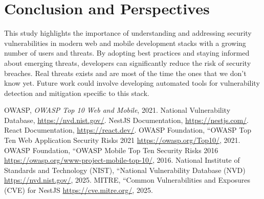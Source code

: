 \documentclass[conference]{IEEEtran}
\begin{document}
\section{Conclusion and Perspectives}
This study highlights the importance of understanding and addressing security vulnerabilities in modern web and mobile development stacks with a growing number of users and threats. By adopting best practices and staying informed about emerging threats, developers can significantly reduce the risk of security breaches. Real threats exists and are most of the time the ones that we don't know yet. Future work could involve developing automated tools for vulnerability detection and mitigation specific to this stack.


\begin{thebibliography}{00}
 OWASP, \emph{OWASP Top 10 Web and Mobile}, 2021.
 National Vulnerability Database, \url{https://nvd.nist.gov/}.
 NestJS Documentation, \url{https://nestjs.com/}.
 React Documentation, \url{https://react.dev/}.
 OWASP Foundation, ``OWASP Top Ten Web Application Security Risks 2021 \url{https://owasp.org/Top10/}, 2021.
 OWASP Foundation, ``OWASP Mobile Top Ten Security Risks 2016 \url{https://owasp.org/www-project-mobile-top-10/}, 2016.
 National Institute of Standards and Technology (NIST), ``National Vulnerability Database (NVD) \url{https://nvd.nist.gov/}, 2025.
 MITRE, ``Common Vulnerabilities and Exposures (CVE) for NestJS \url{https://cve.mitre.org/}, 2025.


\end{thebibliography}
\end{document}
